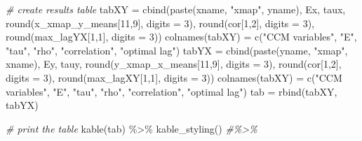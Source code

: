 \documentclass[
]{article}
\newenvironment{Shaded}{\begin{snugshade}}{\end{snugshade}}
\newcommand{\AttributeTok}[1]{\textcolor[rgb]{0.77,0.63,0.00}{#1}}
\newcommand{\CommentTok}[1]{\textcolor[rgb]{0.56,0.35,0.01}{\textit{#1}}}
\newcommand{\DecValTok}[1]{\textcolor[rgb]{0.00,0.00,0.81}{#1}}
\newcommand{\FunctionTok}[1]{\textcolor[rgb]{0.00,0.00,0.00}{#1}}
\newcommand{\NormalTok}[1]{#1}
\newcommand{\OtherTok}[1]{\textcolor[rgb]{0.56,0.35,0.01}{#1}}
\newcommand{\SpecialCharTok}[1]{\textcolor[rgb]{0.00,0.00,0.00}{#1}}
\newcommand{\StringTok}[1]{\textcolor[rgb]{0.31,0.60,0.02}{#1}}
\begin{document}
\begin{Shaded}
\begin{Highlighting}[]
\CommentTok{\# create results table}
\NormalTok{tabXY }\OtherTok{=} \FunctionTok{cbind}\NormalTok{(}\FunctionTok{paste}\NormalTok{(xname, }\StringTok{"xmap"}\NormalTok{, yname), Ex, taux, }\FunctionTok{round}\NormalTok{(x\_xmap\_y\_means[}\DecValTok{11}\NormalTok{,}\DecValTok{9}\NormalTok{], }\AttributeTok{digits =} \DecValTok{3}\NormalTok{), }\FunctionTok{round}\NormalTok{(cor[}\DecValTok{1}\NormalTok{,}\DecValTok{2}\NormalTok{], }\AttributeTok{digits =} \DecValTok{3}\NormalTok{), }\FunctionTok{round}\NormalTok{(max\_lagYX[}\DecValTok{1}\NormalTok{,}\DecValTok{1}\NormalTok{], }\AttributeTok{digits =} \DecValTok{3}\NormalTok{))}
\FunctionTok{colnames}\NormalTok{(tabXY) }\OtherTok{=} \FunctionTok{c}\NormalTok{(}\StringTok{"CCM variables"}\NormalTok{, }\StringTok{"E"}\NormalTok{, }\StringTok{"tau"}\NormalTok{, }\StringTok{"rho"}\NormalTok{, }\StringTok{"correlation"}\NormalTok{, }\StringTok{"optimal lag"}\NormalTok{)}
\NormalTok{tabYX }\OtherTok{=} \FunctionTok{cbind}\NormalTok{(}\FunctionTok{paste}\NormalTok{(yname, }\StringTok{"xmap"}\NormalTok{, xname), Ey, tauy, }\FunctionTok{round}\NormalTok{(y\_xmap\_x\_means[}\DecValTok{11}\NormalTok{,}\DecValTok{9}\NormalTok{], }\AttributeTok{digits =} \DecValTok{3}\NormalTok{), }\FunctionTok{round}\NormalTok{(cor[}\DecValTok{1}\NormalTok{,}\DecValTok{2}\NormalTok{], }\AttributeTok{digits =} \DecValTok{3}\NormalTok{), }\FunctionTok{round}\NormalTok{(max\_lagXY[}\DecValTok{1}\NormalTok{,}\DecValTok{1}\NormalTok{], }\AttributeTok{digits =} \DecValTok{3}\NormalTok{))}
\FunctionTok{colnames}\NormalTok{(tabXY) }\OtherTok{=} \FunctionTok{c}\NormalTok{(}\StringTok{"CCM variables"}\NormalTok{, }\StringTok{"E"}\NormalTok{, }\StringTok{"tau"}\NormalTok{, }\StringTok{"rho"}\NormalTok{, }\StringTok{"correlation"}\NormalTok{, }\StringTok{"optimal lag"}\NormalTok{)}
\NormalTok{tab }\OtherTok{=} \FunctionTok{rbind}\NormalTok{(tabXY, tabYX)}

\CommentTok{\# print the table}
 \FunctionTok{kable}\NormalTok{(tab) }\SpecialCharTok{\%\textgreater{}\%}
   \FunctionTok{kable\_styling}\NormalTok{() }\CommentTok{\#\%\textgreater{}\%}
\end{Highlighting}
\end{Shaded}
\end{document}
